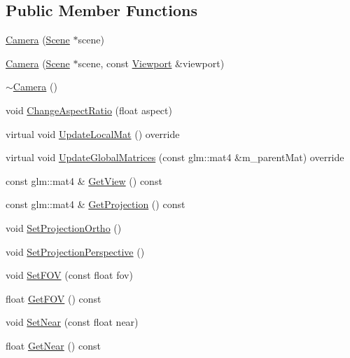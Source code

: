 \subsection*{Public Member Functions}
\begin{DoxyCompactItemize}
\item 
\mbox{\hyperlink{classec_1_1_camera_a5b8034c32e082171bdb61033781cdcc3}{Camera}} (\mbox{\hyperlink{classec_1_1_scene}{Scene}} $\ast$scene)
\item 
\mbox{\hyperlink{classec_1_1_camera_ab5fa55c91ae586754b613c3e8f33b31c}{Camera}} (\mbox{\hyperlink{classec_1_1_scene}{Scene}} $\ast$scene, const \mbox{\hyperlink{classec_1_1_viewport}{Viewport}} \&viewport)
\item 
\mbox{\hyperlink{classec_1_1_camera_a11d706554e37d6dde0b9313a445cbd4b}{$\sim$\+Camera}} ()
\item 
void \mbox{\hyperlink{classec_1_1_camera_ad3790ce4b558aa906fe00e25d8c8c1ed}{Change\+Aspect\+Ratio}} (float aspect)
\item 
virtual void \mbox{\hyperlink{classec_1_1_camera_ab9b2d59d1755a56d67c13a5539b7e033}{Update\+Local\+Mat}} () override
\item 
virtual void \mbox{\hyperlink{classec_1_1_camera_abbdd88f9b352d34fef473064e2ccd625}{Update\+Global\+Matrices}} (const glm\+::mat4 \&m\+\_\+parent\+Mat) override
\item 
const glm\+::mat4 \& \mbox{\hyperlink{classec_1_1_camera_ad5ed2007c501081561fd8ee894f86ae0}{Get\+View}} () const
\item 
const glm\+::mat4 \& \mbox{\hyperlink{classec_1_1_camera_a9c52ad9d4077faf50d1d7170d08e1f13}{Get\+Projection}} () const
\item 
void \mbox{\hyperlink{classec_1_1_camera_ad17ef414e3a08344607a4929f89c7ab3}{Set\+Projection\+Ortho}} ()
\item 
void \mbox{\hyperlink{classec_1_1_camera_a5d6b64ba57b209cca822f4ca9e278a44}{Set\+Projection\+Perspective}} ()
\item 
void \mbox{\hyperlink{classec_1_1_camera_a9af6e8b9a37d5494b5ddf6f098f463bc}{Set\+F\+OV}} (const float fov)
\item 
float \mbox{\hyperlink{classec_1_1_camera_a076c35547c2e64166ac3307b13292131}{Get\+F\+OV}} () const
\item 
void \mbox{\hyperlink{classec_1_1_camera_af2069e18dee1923fb5d9c77bf9366479}{Set\+Near}} (const float near)
\item 
float \mbox{\hyperlink{classec_1_1_camera_abf0024083abfe06c0e5de606ee2b8912}{Get\+Near}} () const

\end{DoxyCompactItemize}
